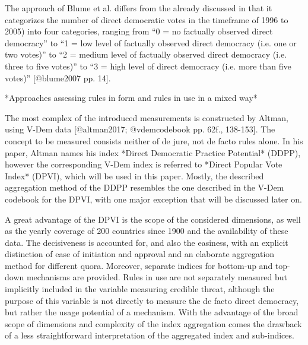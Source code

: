 \documentclass{systats}
\begin{document}
The approach of Blume et al. differs from the already discussed in that it categorizes the number of direct democratic votes in the timeframe of 1996 to 2005) into four categories, ranging from “0 = no factually observed direct democracy” to “1 = low level of factually observed direct democracy (i.e. one or two votes)” to “2 = medium level of factually observed direct democracy (i.e. three to five votes)” to “3 = high level of direct democracy (i.e. more than five votes)” [@blume2007 pp. 14].

*Approaches assessing rules in form and rules in use in a mixed way*


The most complex of the introduced measurements is constructed by Altman, using V-Dem data [@altman2017; @vdemcodebook pp. 62f., 138-153]. The concept to be measured consists neither of de jure, not de facto rules alone. In his paper, Altman names his index *Direct Democratic Practice Potential* (DDPP), however the corresponding V-Dem index is referred to *Direct Popular Vote Index* (DPVI), which will be used in this paper. Mostly, the described aggregation method of the DDPP resembles the one described in the V-Dem codebook for the DPVI, with one major exception that will be discussed later on.



A great advantage of the DPVI is the scope of the considered dimensions, as well as the yearly coverage of 200 countries since 1900 and the availability of these data. The decisiveness is accounted for, and  also the easiness, with an explicit distinction of ease of initiation and approval and an elaborate aggregation method for different quora. Moreover, separate indices for bottom-up and top-down mechanisms are provided. Rules in use are not separately measured but implicitly included in the variable measuring credible threat, although the purpose of this variable is not directly to measure the de facto direct democracy, but rather the usage potential of a mechanism. With the advantage of the broad scope of dimensions and complexity of the index aggregation comes the drawback of a less straightforward interpretation of the aggregated index and sub-indices.  
\end{document}
